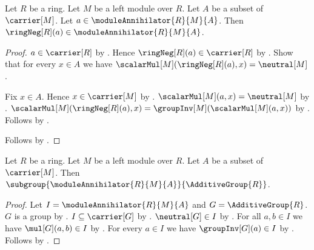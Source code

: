 \begin{proposition}\label{module_annihilator_negation}
    Let $R$ be a ring.
    Let $M$ be a left module over $R$.
    Let $A$ be a subset of $\carrier[M]$.
    Let $a\in\moduleAnnihilator{R}{M}{A}$.
    Then $\ringNeg[R](a)\in\moduleAnnihilator{R}{M}{A}$.
\end{proposition}
\begin{proof}
    $a\in\carrier[R]$ by .
    Hence $\ringNeg[R](a)\in\carrier[R]$ by .
    Show that for every $x\in A$ we have
        $\scalarMul[M](\ringNeg[R](a),x)=\neutral[M]$.
    \begin{subproof}
        Fix $x\in A$.
        Hence $x\in\carrier[M]$ by .
        $\scalarMul[M](a,x)=\neutral[M]$ by
            .
        $\scalarMul[M](\ringNeg[R](a),x)
            =\groupInv[M](\scalarMul[M](a,x))$ by
            .
        Follows by .
    \end{subproof}
    Follows by .
\end{proof}

\begin{theorem}\label{module_annihilator_additive_subgroup}
    Let $R$ be a ring.
    Let $M$ be a left module over $R$.
    Let $A$ be a subset of $\carrier[M]$.
    Then
        $\subgroup{\moduleAnnihilator{R}{M}{A}}{\AdditiveGroup{R}}$.
\end{theorem}
\begin{proof}
    Let $I=\moduleAnnihilator{R}{M}{A}$ and $G=\AdditiveGroup{R}$.
    $G$ is a group by
        .
    $I\subseteq\carrier[G]$ by
        .
    $\neutral[G]\in I$ by
        .
    For all $a,b\in I$ we have $\mul[G](a,b)\in I$ by
        .
    For every $a\in I$ we have $\groupInv[G](a)\in I$ by
        .
    Follows by .
\end{proof}

